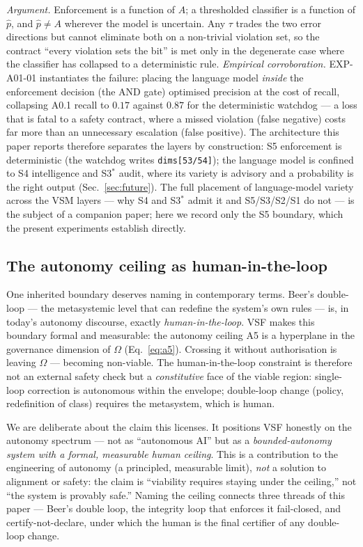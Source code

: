 \documentclass[11pt, a4paper]{article}
\begin{document}
\noindent\emph{Argument.} Enforcement is a function of $A$; a thresholded
classifier is a function of $\hat p$, and $\hat p\neq A$ wherever the model is
uncertain. Any $\tau$ trades the two error directions but cannot eliminate both
on a non-trivial violation set, so the contract ``every violation sets the bit''
is met only in the degenerate case where the classifier has collapsed to a
deterministic rule. \emph{Empirical corroboration.} EXP-A01-01 instantiates the
failure: placing the language model \emph{inside} the enforcement decision (the
AND gate) optimised precision at the cost of recall, collapsing A0.1 recall to
$0.17$ against $0.87$ for the deterministic watchdog --- a loss that is fatal to
a safety contract, where a missed violation (false negative) costs far more than
an unnecessary escalation (false positive). The architecture this paper reports
therefore separates the layers by construction: S5 enforcement is deterministic
(the watchdog writes \texttt{dims[53/54]}); the language model is confined to S4
intelligence and S3$^\ast$ audit, where its variety is advisory and a
probability is the right output (Sec.~\ref{sec:future}). The full placement of
language-model variety across the VSM layers --- why S4 and S3$^\ast$ admit it
and S5/S3/S2/S1 do not --- is the subject of a companion paper; here we record
only the S5 boundary, which the present experiments establish directly.

\subsection{The autonomy ceiling as human-in-the-loop}
\label{sec:hitl}

One inherited boundary deserves naming in contemporary terms. Beer's
double-loop --- the metasystemic level that can redefine the system's own rules
--- is, in today's autonomy discourse, exactly \emph{human-in-the-loop}. VSF
makes this boundary formal and measurable: the autonomy ceiling A5 is a
hyperplane in the governance dimension of $\Omega$ (Eq.~\eqref{eq:a5}). Crossing
it without authorisation is leaving $\Omega$ --- becoming non-viable. The
human-in-the-loop constraint is therefore not an external safety check but a
\emph{constitutive} face of the viable region: single-loop correction is
autonomous within the envelope; double-loop change (policy, redefinition of
class) requires the metasystem, which is human.

We are deliberate about the claim this licenses. It positions VSF honestly on
the autonomy spectrum --- not as ``autonomous AI'' but as a \emph{bounded-autonomy
system with a formal, measurable human ceiling}. This is a contribution to the
engineering of autonomy (a principled, measurable limit), \emph{not} a solution
to alignment or safety: the claim is ``viability requires staying under the
ceiling,'' not ``the system is provably safe.'' Naming the ceiling connects three
threads of this paper --- Beer's double loop, the integrity loop that enforces it
fail-closed, and certify-not-declare, under which the human is the final
certifier of any double-loop change.
\end{document}

